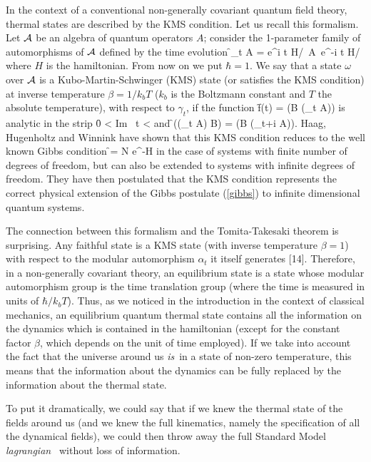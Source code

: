 In the context of a conventional non-generally covariant quantum
field theory, thermal states are described by the KMS condition.
Let us recall this formalism.  Let $\cal A$ be an
algebra of quantum operators $A$; consider the 1-parameter
family of automorphisms of $\cal A$ defined by the time
evolution
\f
	\gamma_t A = e^{i t H/\hbar}\ A\ e^{-i t H/\hbar}  \label{tf}
\ff
where $H$ is the hamiltonian.  From now on we put $\hbar=1$. We
say that a state $\omega$ over $\cal A$ is a
Kubo-Martin-Schwinger (KMS) state (or satisfies the KMS
condition) at inverse temperature $\beta = 1/k_{b}T$ ($k_b$ is
the Boltzmann constant and $T$ the absolute temperature), with
respect to $\gamma_t$, if the
function
\f
	f(t) = \omega(B (\gamma_{t} A))
\ff
is analytic in the strip
\f
	0 < {\rm Im\ } t < \beta
\ff
and
\f
	\omega((\gamma_t A) B) = \omega(B (\gamma_{t+i\beta}
A)).
\ff
Haag, Hugenholtz and Winnink \cite{hhw} have shown that this
KMS condition
reduces to the well known Gibbs condition
\f
	\omega= N e^{-\beta H}				\label{gibbs}
\ff
in the case of systems with finite number of degrees of freedom,
but can also be extended to systems with infinite degrees of
freedom. They have then postulated that the KMS condition
represents the correct physical extension of the Gibbs postulate
(\ref{gibbs}) to infinite dimensional quantum systems.

The connection between this formalism and the Tomita-Takesaki
theorem is surprising.  Any faithful state is a KMS
state (with inverse temperature $\beta =1$) with respect to the
modular automorphism $\alpha_t$ it itself generates [14].  Therefore,
in a non-generally covariant theory, an equilibrium state is a
state whose modular automorphism group is the time translation
group (where the time is measured in units of
$\hbar/k_{b}T$).  Thus, as we noticed in the introduction
in the
context of classical mechanics, an equilibrium quantum thermal
state contains all the information on the dynamics which is
contained in the hamiltonian (except for the constant
factor $\beta$, which depends on the unit of time employed).   If
we take into account the fact that the universe around us {\it
is\,} in a state of non-zero temperature, this means that the
information about the dynamics can be fully replaced by the
information about the thermal state.

To put it dramatically, we could say that if we knew
the thermal state of the fields around us (and we knew the
full kinematics, namely the specification of all the
dynamical fields), we could then throw away the full
Standard Model {\it lagrangian\ } without loss of information.

